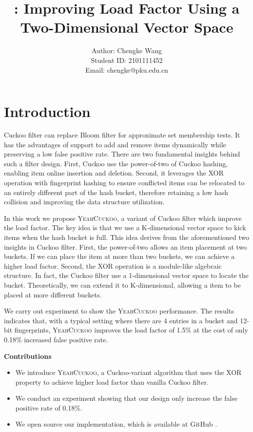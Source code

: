 \documentclass[11pt]{IEEEtran}
\title{\sys: Improving Load Factor Using a Two-Dimensional Vector Space}
\author{Author: Chengke Wang \\
Student ID: 2101111452 \\ 
Email: chengke@pku.edu.cn}
\newcommand{\nosection}[1]{\vspace{3pt}\noindent\textbf{#1}}
\newcommand{\sys}{\textsc{YeahCuckoo}\xspace}
\begin{document}
\maketitle

\section{Introduction}

Cuckoo filter \cite{cuckoo} can replace Bloom filter \cite{bloom} for approximate set membership tests. It has the advantages of support to add and remove items dynamically while preserving a low false positive rate. There are two fundamental insights behind such a filter design. First, Cuckoo use the power-of-two of Cuckoo hashing, enabling item online insertion and deletion. Second, it leverages the XOR operation with fingerprint hashing to ensure conflicted items can be relocated to an entirely different part of the hash bucket, therefore retaining a low hash collision and improving the data structure utilization. 

In this work we propose \sys, a variant of Cuckoo filter which improve the load factor. The key idea is that we use a K-dimensional vector space to kick items when the hash bucket is full. This idea derives from the aforementioned two insights in Cuckoo filter. First, the power-of-two allows an item placement at two buckets. If we can place the item at more than two buckets, we can achieve a higher load factor. Second, the XOR operation is a module-like algebraic structure. In fact, the Cuckoo filter use a 1-dimensional vector space to locate the bucket. Theoretically, we can extend it to K-dimensional, allowing a item to be placed at more different buckets.

We carry out experiment to show the \sys performance. The results indicates that, with a typical setting where there are 4 entries in a bucket and 12-bit fingerprints, \sys improves the load factor of 1.5\% at the cost of only 0.18\% increased false positive rate.

\nosection{Contributions}
\begin{itemize}
	\item We introduce \sys, a Cuckoo-variant algorithm that uses the XOR property to achieve higher load factor than vanilla Cuckoo filter. 
	\item We conduct an experiment showing that our design only increase the false positive rate of 0.18\%.
	\item We open source our implementation, which is available at GitHub \cite{yeah}.
\end{itemize}
\end{document}
